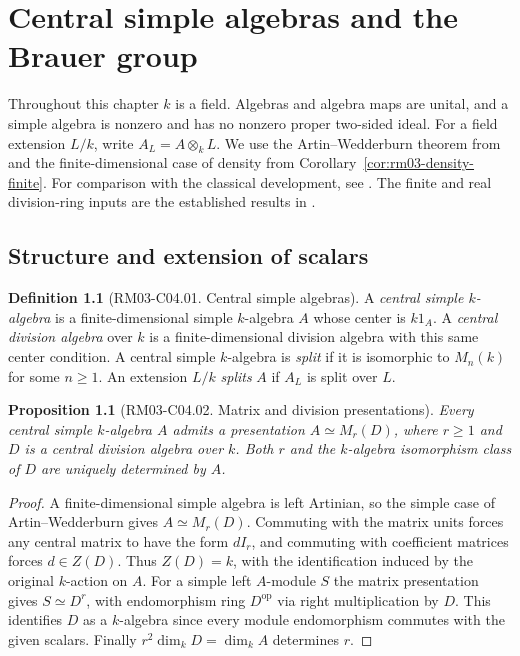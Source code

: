 \documentclass[11pt,oneside,openany]{book}
\newtheorem{proposition}[theorem]{Proposition}
\theoremstyle{definition}
\newtheorem{definition}[theorem]{Definition}
\theoremstyle{remark}
\begin{document}
\chapter{Central simple algebras and the Brauer group}
\label{ch:rm03-central-simple}

Throughout this chapter \(k\) is a field. Algebras and algebra maps are
unital, and a simple algebra is nonzero and has no nonzero proper
two-sided ideal. For a field extension \(L/k\), write \(A_L=A\otimes_k L\).
We use the Artin--Wedderburn theorem from
\cite[ALG-03-C03-R04]{p103} and the finite-dimensional case of density
from Corollary~\ref{cor:rm03-density-finite}. For comparison with the
classical development, see \cite[Sections~11.3--11.8]{stackscsa}.
The finite and real division-ring inputs are the established results in
\cite[K07.23.finite\_division\_ring and K07.23.frobenius]{d07}.

\section{Structure and extension of scalars}

\begin{definition}[RM03-C04.01. Central simple algebras]
\label{def:rm03-csa}
A \emph{central simple \(k\)-algebra} is a finite-dimensional simple
\(k\)-algebra \(A\) whose center is \(k1_A\). A \emph{central division
algebra} over \(k\) is a finite-dimensional division algebra with this
same center condition. A central simple \(k\)-algebra is \emph{split}
if it is isomorphic to \(M_n(k)\) for some \(n\geq 1\). An extension
\(L/k\) \emph{splits} \(A\) if \(A_L\) is split over \(L\).
\end{definition}

\begin{proposition}[RM03-C04.02. Matrix and division presentations]
\label{prop:rm03-csa-matrix}
Every central simple \(k\)-algebra \(A\) admits a presentation
\(A\simeq M_r(D)\), where \(r\geq 1\) and \(D\) is a central division
algebra over \(k\). Both \(r\) and the \(k\)-algebra isomorphism class
of \(D\) are uniquely determined by \(A\).
\end{proposition}
\begin{proof}
A finite-dimensional simple algebra is left Artinian, so the simple
case of Artin--Wedderburn gives \(A\simeq M_r(D)\). Commuting with
the matrix units forces any central matrix to have the form \(dI_r\),
and commuting with coefficient matrices forces \(d\in Z(D)\).
Thus \(Z(D)=k\), with the identification induced by the original
\(k\)-action on \(A\). For a simple left \(A\)-module \(S\) the matrix
presentation gives \(S\simeq D^r\), with endomorphism ring \(D^{\mathrm{op}}\)
via right multiplication by \(D\). This identifies \(D\) as a
\(k\)-algebra since every module endomorphism commutes with the
given scalars. Finally \(r^2\dim_k D=\dim_k A\) determines \(r\).
\end{proof}
\end{document}

